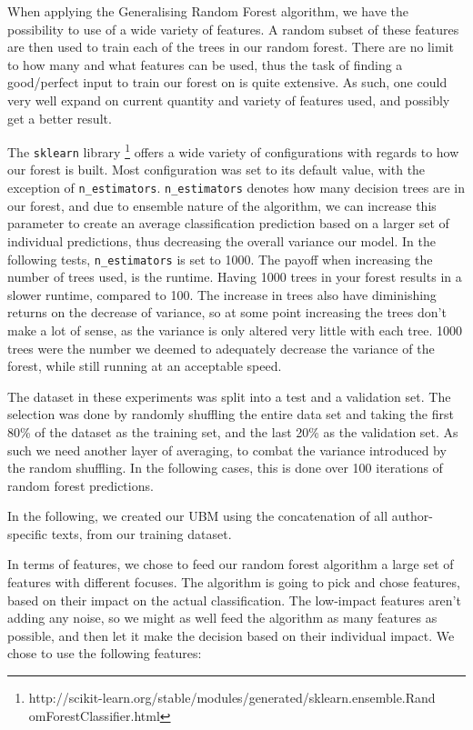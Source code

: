 When applying the Generalising Random Forest algorithm, we have the possibility
to use of a wide variety of features. A random subset of these features are then
used to train each of the trees in our random forest. There are no limit to how
many and what features can be used, thus the task of finding a good/perfect
input to train our forest on is quite extensive. As such, one could very well
expand on current quantity and variety of features used, and possibly get a
better result.

The \texttt{sklearn} library
\footnote{http://scikit-learn.org/stable/modules/generated/sklearn.ensemble.Rand
omForestClassifier.html} offers a wide variety of configurations with regards to
how our forest is built. Most configuration was set to its default value, with
the exception of \texttt{n\_estimators}. \texttt{n\_estimators} denotes how many
decision trees are in our forest, and due to ensemble nature of the algorithm,
we can increase this parameter to create an average classification prediction
based on a larger set of individual predictions, thus decreasing the overall
variance our model. In the following tests, \texttt{n\_estimators} is set to
1000. The payoff when increasing the number of trees used, is the runtime.
Having 1000 trees in your forest results in a slower runtime, compared to 100.
The increase in trees also have diminishing returns on the decrease of variance,
so at some point increasing the trees don't make a lot of sense, as the
variance is only altered very little with each tree. 1000 trees were the number
we deemed to adequately decrease the variance of the forest, while still running
at an acceptable speed.

The dataset in these experiments was split into a test and a validation set.
The selection was done by randomly shuffling the entire data set and taking
the first 80\% of the dataset as the training set, and the last 20\% as the
validation set. As such we need another layer of averaging, to combat the
variance introduced by the random shuffling. In the following cases, this is
done over 100 iterations of random forest predictions.

In the following, we created our \gls{UBM} using the concatenation of all
author-specific texts, from our training dataset.

In terms of features, we chose to feed our random forest algorithm a large set
of features with different focuses. The algorithm is going to pick and chose
features, based on their impact on the actual classification. The low-impact
features aren't adding any noise, so we might as well feed the algorithm as
many features as possible, and then let it make the decision based on their
individual impact. We chose to use the following features:

